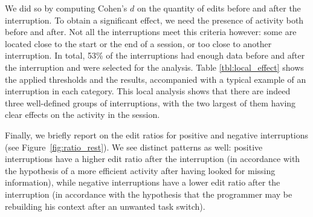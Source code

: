 \documentclass[times]{smrauth}
\begin{document}
We did so by computing Cohen's $d$ on the quantity of edits before and after the interruption. To obtain a significant effect, we need the presence of activity both before and after. Not all the interruptions meet this criteria however: some are located close to the start or the end of a session, or too close to another interruption.  In total, 53\% of the interruptions had enough data before and after the interruption and were selected for the analysis. %
Table \ref{tbl:local_effect} shows the applied thresholds and the results, accompanied with a typical example of an interruption in each category. This local analysis shows that there are indeed three well-defined groups of interruptions, with the two largest of them having clear effects on the activity in the session.

Finally, we briefly report on the edit ratios for positive and negative interruptions (see Figure~\ref{fig:ratio_rest}). We see distinct patterns as well: positive interruptions have a higher edit ratio after the interruption (in accordance with the hypothesis of a more efficient activity after having looked for missing information), while negative interruptions have a lower edit ratio after the interruption (in accordance with the hypothesis that the programmer may be rebuilding his context after an unwanted task switch).

\end{document}
